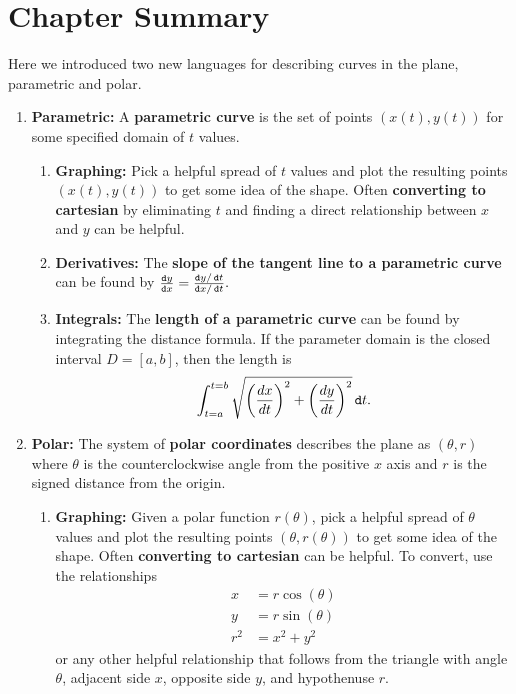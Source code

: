 \section{Chapter Summary}

Here we introduced two new languages for describing curves in the plane, parametric and polar.

\begin{enumerate}
\item {\bf Parametric:} A {\bf parametric curve} is the set of points $\left(x(t),y(t)\right)$ for some specified domain of $t$ values.
\begin{enumerate}
\item {\bf Graphing:} Pick a helpful spread of $t$ values and plot the resulting points $\left(x(t),y(t)\right)$ to get some idea of the shape.  Often {\bf converting to cartesian} by eliminating $t$ and finding a direct relationship between $x$ and $y$ can be helpful.
\item {\bf Derivatives:} The {\bf slope of the tangent line to a parametric curve} can be found by $\frac{\mathop{}\!\mathtt{d} y}{\mathop{}\!\mathtt{d} x}=\frac{\mathop{}\!\mathtt{d} y/\mathop{}\!\mathtt{d} t}{\mathop{}\!\mathtt{d} x/\mathop{}\!\mathtt{d} t} .$
\item {\bf Integrals:} The {\bf length of a parametric curve} can be found by integrating the distance formula.  If the parameter domain is the closed interval $D=[a,b]$, then the length is  $$\int_{t=a}^{t=b}\sqrt{\left(\frac{dx}{dt}\right)^2+\left(\frac{dy}{dt}\right)^2} \mathop{}\!\mathtt{d} t. $$
\end{enumerate}
\item {\bf Polar:} The system of {\bf polar coordinates} describes the plane as $\left(\theta,r\right)$ where $\theta$ is the counterclockwise angle from the positive $x$ axis and $r$ is the signed distance from the origin. 
\begin{enumerate}
\item {\bf Graphing:} Given a polar function $r\left(\theta\right)$, pick a helpful spread of $\theta$ values and plot the resulting points $\left(\theta,r\left(\theta\right)\right)$ to get some idea of the shape.  Often {\bf converting to cartesian} can be helpful.  To convert, use the relationships
\begin{align*}
x&=r\cos\left(\theta\right)\\
y&=r\sin\left(\theta\right) \\
r^2&=x^2+y^2
\end{align*} or any other helpful relationship that follows from the triangle with angle $\theta$, adjacent side $x$, opposite side $y$, and hypothenuse $r$. 

\end{enumerate}
\end{enumerate}
